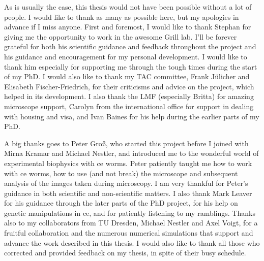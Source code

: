 As is usually the case, this thesis would not have been possible without a lot of people. I would like to thank as many as possible here, but my apologies in advance if I miss anyone. First and foremost, I would like to thank Stephan for giving me the opportunity to work in the awesome Grill lab. I'll be forever grateful for both his scientific guidance and feedback throughout the project and his guidance and encouragement for my personal development. I would like to thank him especially for supporting me through the tough times during the start of my PhD. I would also like to thank my TAC committee, Frank J{\"u}licher and Elisabeth Fischer-Friedrich, for their criticisms and advice on the project, which helped in its development. I also thank the LMF (especially Britta) for amazing microscope support, Carolyn from the international office for support in dealing with housing and visa, and Ivan Baines for his help during the earlier parts of my PhD.

A big thanks goes to Peter Gro{\ss}, who started this project before I joined with Mirna Kramar and Michael Nestler, and introduced me to the wonderful world of experimental biophysics with \ac{ce} worms. Peter patiently taught me how to work with \ac{ce} worms, how to use (and not break) the microscope and subsequent analysis of the images taken during microscopy. I am very thankful for Peter's guidance in both scientific and non-scientific matters. I also thank Mark Leaver for his guidance through the later parts of the PhD project, for his help on genetic manipulations in \ac{ce}, and for patiently listening to my ramblings. Thanks also to my collaborators from TU Dresden, Michael Nestler and Axel Voigt, for a fruitful collaboration and the numerous numerical simulations that support and advance the work described in this thesis. I would also like to thank all those who corrected and provided feedback on my thesis, in spite of their busy schedule.

